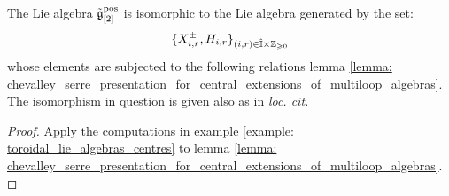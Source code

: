         \begin{corollary}
            The Lie algebra $\tilde{\mathfrak{g}}_{[2]}^{\mathrm{pos}}$ is isomorphic to the Lie algebra generated by the set:
                $$\{ X_{i, r}^{\pm}, H_{i, r} \}_{(i, r) \in \hat{\simpleroots} \x \Z_{\geq 0}}$$
            whose elements are subjected to the following relations lemma \ref{lemma: chevalley_serre_presentation_for_central_extensions_of_multiloop_algebras}. The isomorphism in question is given also as in \textit{loc. cit.}
        \end{corollary}
            \begin{proof}
                Apply the computations in example \ref{example: toroidal_lie_algebras_centres} to lemma \ref{lemma: chevalley_serre_presentation_for_central_extensions_of_multiloop_algebras}.
            \end{proof}